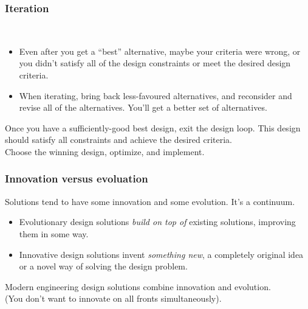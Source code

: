 \begin{frame}
\frametitle{Iteration}

\begin{changemargin}{1.5cm}
\\[1em]
\begin{itemize}
\item Even after you
get a ``best'' alternative, maybe your criteria were 
wrong, or you didn't satisfy all of the design constraints or meet
the desired design criteria.\\[1em]

\item When iterating, bring back less-favoured alternatives,
and reconsider and revise all of the alternatives. You'll get a better set
of alternatives.\\[1em]

\end{itemize}

Once you have a sufficiently-good best design, exit the
design loop. This design should satisfy all constraints and achieve the
desired criteria. \\[1em]

Choose the winning design, optimize, and implement.
\end{changemargin}

\end{frame}

\begin{frame}
\frametitle{Innovation versus evoluation}

\begin{changemargin}{1.5cm}
Solutions tend to have some
innovation and some evolution. It's a continuum.
\begin{itemize}
\item Evolutionary design solutions \emph{build on top of} existing solutions,
improving them in some way.
\item Innovative design solutions invent \emph{something new}, a completely
original idea or a novel way of solving the design problem.
\end{itemize}

Modern engineering design solutions combine innovation and evolution. \\[1em]

(You don't want to innovate on all fronts simultaneously). 
\end{changemargin}

\end{frame}

